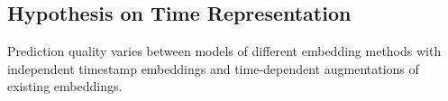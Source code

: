 \subsection{Hypothesis on Time Representation}
\label{sec:hypothesis_time_representation}

\begin{hypothesis}
\label{hyp:time_representation}
Prediction quality varies between models of different embedding methods with independent timestamp embeddings and time-dependent augmentations of existing embeddings.
\end{hypothesis}